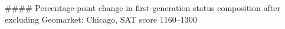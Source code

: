 #### Percentage-point change in first-generation status composition after excluding Geomarket: Chicago, SAT score 1160–1300
